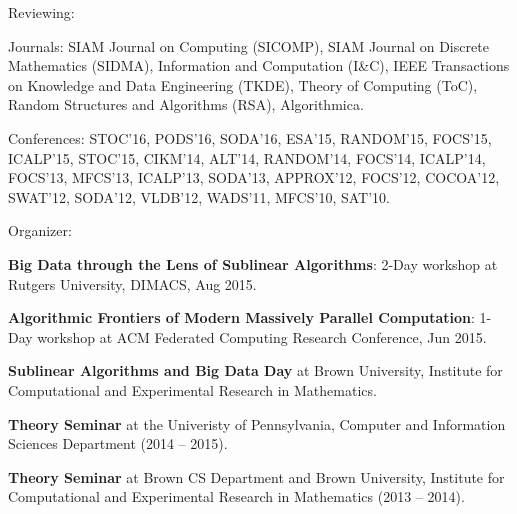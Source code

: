\documentclass[11pt]{article}
\newenvironment{innerlist}[1][\enskip\textbullet]%
        {\begin{compactitem}[#1]}{\end{compactitem}}
\newcommand{\blankline}{\quad\pagebreak[2]}
\begin{document}
\blankline

Reviewing:

\begin{innerlist}
	\item Journals: SIAM Journal on Computing (SICOMP), SIAM Journal on Discrete Mathematics (SIDMA), Information and Computation (I\&C), IEEE Transactions on Knowledge and Data Engineering (TKDE), Theory of Computing (ToC), Random Structures and Algorithms (RSA), Algorithmica.
	\item Conferences: STOC'16, PODS'16, SODA'16, ESA'15, RANDOM'15, FOCS'15, ICALP'15, STOC'15, CIKM'14, ALT'14, RANDOM'14, FOCS'14, ICALP'14, FOCS'13, MFCS'13, ICALP'13, SODA'13, APPROX'12, FOCS'12, COCOA'12, SWAT'12, SODA'12, VLDB'12, WADS'11, MFCS'10, SAT'10.
\end{innerlist}

\blankline

Organizer:
\begin{innerlist}
	\item \textbf{Big Data through the Lens of Sublinear Algorithms}: 2-Day workshop at Rutgers University, DIMACS, Aug 2015.
	\item \textbf{Algorithmic Frontiers of Modern Massively Parallel Computation}: 1-Day workshop at ACM Federated Computing Research Conference, Jun 2015.
	\item \textbf{Sublinear Algorithms and Big Data Day} at Brown University, Institute for Computational and Experimental Research in Mathematics.
	\item \textbf{Theory Seminar} at the Univeristy of Pennsylvania, Computer and Information Sciences Department (2014 -- 2015).
	\item \textbf{Theory Seminar} at Brown CS Department and Brown University, Institute for Computational and Experimental Research in Mathematics (2013 -- 2014).
\end{innerlist}
\end{document}
